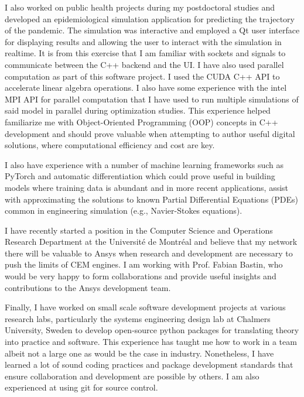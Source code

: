 \documentclass[12pt]{article} %
\begin{document}
\medskip %

I also worked on public health projects during my postdoctoral studies and developed an epidemiological simulation application for predicting the trajectory of the pandemic. The simulation was interactive and employed a Qt user interface for displaying results and allowing the user to interact with the simulation in realtime. It is from this exercise that I am familiar with sockets and signals to communicate between the C++ backend and the UI. I have also used parallel computation as part of this software project. I used the CUDA C++ API to accelerate linear algebra operations. I also have some experience with the intel MPI API for parallel computation that I have used to run multiple simulations of said model in parallel during optimization studies. This experience helped familiarize me with Object-Oriented Programming (OOP) concepts in C++ development and should prove valuable when attempting to author useful digital solutions, where computational efficiency and cost are key.

\medskip %

I also have experience with a number of machine learning frameworks such as PyTorch and automatic differentiation which could prove useful in building models where training data is abundant and in more recent applications, assist with approximating the solutions to known Partial Differential Equations (PDEs) common in engineering simulation (e.g., Navier-Stokes equations).

\medskip %

I have recently started a position in the Computer Science and Operations Research Department at the Universit\'{e} de Montr\'{e}al and believe that my network there will be valuable to Ansys when research and development are necessary to push the limits of CEM engines. I am working with Prof. Fabian Bastin, who would be very happy to form collaborations and provide useful insights and contributions to the Ansys development team.

\medskip %

Finally, I have worked on small scale software development projects at various research labs, particularly the systems engineering design lab at Chalmers University, Sweden to develop open-source python packages for translating theory into practice and software. This experience has taught me how to work in a team albeit not a large one as would be the case in industry. Nonetheless, I have learned a lot of sound coding practices and package development standards that ensure collaboration and development are possible by others. I am also experienced at using git for source control.
\end{document}
